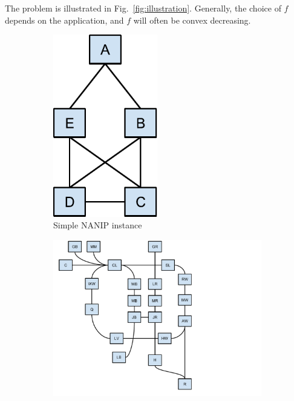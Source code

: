 \documentclass[english]{llncs}
\begin{document}
The problem is illustrated in Fig.~\ref{fig:illustration}.  Generally, the
choice of $f$ depends on the application, and $f$ will often be convex
decreasing. 

\begin{figure}[th]
\begin{subfigure}[b]{0.4\textwidth}
\centering
\includegraphics[width=0.5\textwidth]{simple}
\caption{Simple NANIP instance}
\end{subfigure}%
\begin{subfigure}[b]{0.6\textwidth}
\centering
\includegraphics[width=1.0\textwidth]{Chicago_Loop_schematic} 

\end{subfigure}
\end{figure}
\end{document}
